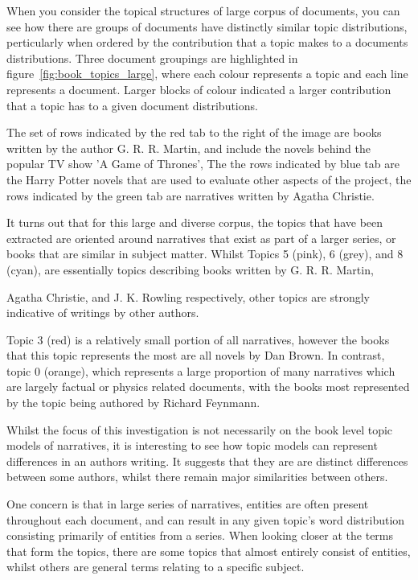 \documentclass[10pt]{report}
\begin{document}
\begin{multicols}{2}
  \columnbreak
  
  When you consider the topical structures of large corpus of documents, you can see how there are  groups of documents have distinctly similar topic distributions, perticularly when ordered by the contribution that a topic makes to a documents distributions. Three document groupings are highlighted in figure~\ref{fig:book_topics_large}, where each colour represents a topic and each line represents a document. Larger blocks of colour indicated a larger contribution that a topic has to a given document distributions.

  The set of rows indicated by the red tab to the right of the image are books written by the author G. R. R. Martin, and include the novels behind the popular TV show 'A Game of Thrones', The the rows indicated by blue tab are the Harry Potter novels that are used to evaluate other aspects of the project, the rows indicated by the green tab are narratives written by Agatha Christie.

It turns out that for this large and diverse corpus, the topics that have been extracted are oriented around narratives that exist as part of a larger series, or books that are similar in subject matter. Whilst Topics 5 (pink), 6 (grey), and 8 (cyan), are essentially topics describing books written by G. R. R. Martin, 
\end{multicols}
 Agatha Christie, and J. K. Rowling respectively, other topics are strongly indicative of writings by other authors.

Topic 3 (red) is a relatively small portion of all narratives, however the books that this topic represents the most are all novels by Dan Brown. In contrast, topic 0 (orange), which represents a large proportion of many narratives which are largely factual or physics related documents, with the books most represented by the topic being authored by Richard Feynmann.

Whilst the focus of this investigation is not necessarily on the book level topic models of narratives, it is interesting to see how topic models can represent differences in an authors writing. It suggests that they are are distinct differences between some authors, whilst there remain major similarities between others.

One concern is that in large series of narratives, entities are often present throughout each document,  and can result in any given topic's word distribution consisting primarily of entities from a series. When looking closer at the terms that form the topics, there are some topics that almost entirely consist of entities, whilst others are general terms relating to a specific subject.
\end{document}
